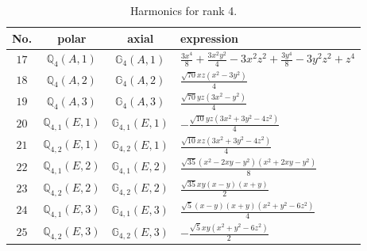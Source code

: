 \documentclass[fleqn,8pt,landscape]{jsarticle}
\begin{document}
\begin{table}[ht!]
\begin{center}
\caption{Harmonics for rank 4.}
\renewcommand{\arraystretch}{1.3}
\begin{tabular}{cccl} \hline \hline
No. & polar & axial & expression \\ \hline
$ 17 $ & $ \mathbb{Q}_{4}(A,1) $ & $ \mathbb{G}_{4}(A,1) $ & $ \frac{3 x^{4}}{8} + \frac{3 x^{2} y^{2}}{4} - 3 x^{2} z^{2} + \frac{3 y^{4}}{8} - 3 y^{2} z^{2} + z^{4} $ \\
$ 18 $ & $ \mathbb{Q}_{4}(A,2) $ & $ \mathbb{G}_{4}(A,2) $ & $ \frac{\sqrt{70} x z \left(x^{2} - 3 y^{2}\right)}{4} $ \\
$ 19 $ & $ \mathbb{Q}_{4}(A,3) $ & $ \mathbb{G}_{4}(A,3) $ & $ \frac{\sqrt{70} y z \left(3 x^{2} - y^{2}\right)}{4} $ \\
$ 20 $ & $ \mathbb{Q}_{4,1}(E,1) $ & $ \mathbb{G}_{4,1}(E,1) $ & $ - \frac{\sqrt{10} y z \left(3 x^{2} + 3 y^{2} - 4 z^{2}\right)}{4} $ \\
$ 21 $ & $ \mathbb{Q}_{4,2}(E,1) $ & $ \mathbb{G}_{4,2}(E,1) $ & $ \frac{\sqrt{10} x z \left(3 x^{2} + 3 y^{2} - 4 z^{2}\right)}{4} $ \\
$ 22 $ & $ \mathbb{Q}_{4,1}(E,2) $ & $ \mathbb{G}_{4,1}(E,2) $ & $ \frac{\sqrt{35} \left(x^{2} - 2 x y - y^{2}\right) \left(x^{2} + 2 x y - y^{2}\right)}{8} $ \\
$ 23 $ & $ \mathbb{Q}_{4,2}(E,2) $ & $ \mathbb{G}_{4,2}(E,2) $ & $ \frac{\sqrt{35} x y \left(x - y\right) \left(x + y\right)}{2} $ \\
$ 24 $ & $ \mathbb{Q}_{4,1}(E,3) $ & $ \mathbb{G}_{4,1}(E,3) $ & $ \frac{\sqrt{5} \left(x - y\right) \left(x + y\right) \left(x^{2} + y^{2} - 6 z^{2}\right)}{4} $ \\
$ 25 $ & $ \mathbb{Q}_{4,2}(E,3) $ & $ \mathbb{G}_{4,2}(E,3) $ & $ - \frac{\sqrt{5} x y \left(x^{2} + y^{2} - 6 z^{2}\right)}{2} $ \\
 \hline \hline
\end{tabular}
\end{center}
\end{table}
\end{document}
